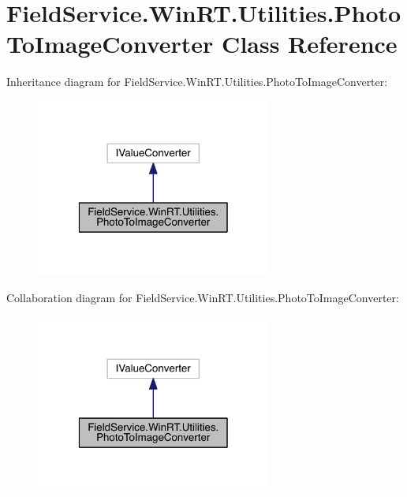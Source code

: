 \hypertarget{class_field_service_1_1_win_r_t_1_1_utilities_1_1_photo_to_image_converter}{\section{Field\+Service.\+Win\+R\+T.\+Utilities.\+Photo\+To\+Image\+Converter Class Reference}
\label{class_field_service_1_1_win_r_t_1_1_utilities_1_1_photo_to_image_converter}
}


Inheritance diagram for Field\+Service.\+Win\+R\+T.\+Utilities.\+Photo\+To\+Image\+Converter\+:
\nopagebreak
\begin{figure}[H]
\begin{center}
\leavevmode
\includegraphics[width=220pt]{class_field_service_1_1_win_r_t_1_1_utilities_1_1_photo_to_image_converter__inherit__graph}
\end{center}
\end{figure}


Collaboration diagram for Field\+Service.\+Win\+R\+T.\+Utilities.\+Photo\+To\+Image\+Converter\+:
\nopagebreak
\begin{figure}[H]
\begin{center}
\leavevmode
\includegraphics[width=220pt]{class_field_service_1_1_win_r_t_1_1_utilities_1_1_photo_to_image_converter__coll__graph}
\end{center}
\end{figure}
